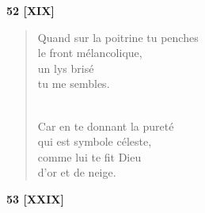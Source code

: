 \documentclass[a4paper,11pt]{book}
\begin{document}
\bigskip

\begin{center} {\bf 52 [XIX]} \end{center}

\begin{verse}
Quand sur la poitrine tu penches \\
le front mélancolique, \\
un lys brisé \\
tu me sembles. \\ \

Car en te donnant la pureté \\
qui est symbole céleste, \\
comme lui te fit Dieu \\
d'or et de neige. \\
\end{verse}


\begin{center} {\bf 53 [XXIX]} \end{center}
\end{document}
